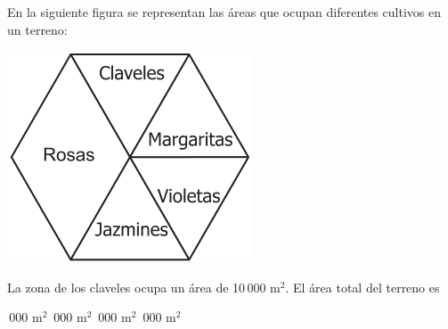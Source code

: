 \documentclass[10pt,letterpaper,addpoints]{exam}
\begin{document}
\begin{multicols}{2}
\begin{questions}
\begin{oneparchoices}
\end{oneparchoices}
\question En la siguiente figura se representan las áreas que ocupan diferentes cultivos en un terreno:
\begin{center}
\includegraphics[scale=.75]{Images/claveles.png} 
\end{center}
La zona de los claveles ocupa un área de 10\,000 m$^{2}$. El área total del terreno es
\begin{multicols}{2}
\begin{choices}
\,000 m$^{2}$
\,000 m$^{2}$
\,000 m$^{2}$
\,000 m$^{2}$
\end{choices}
\end{multicols}
\end{questions}
\end{multicols}
\end{document}

